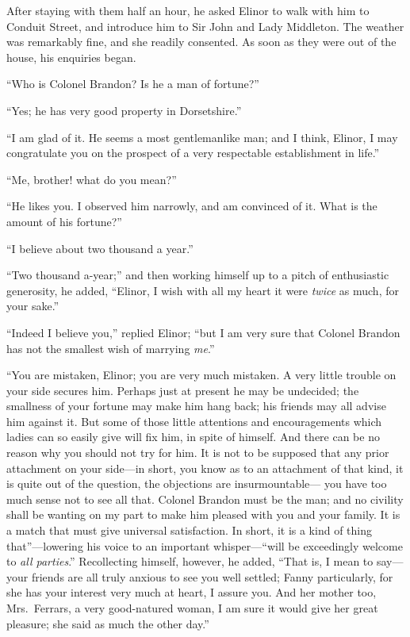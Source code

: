 After staying with them half an hour, he asked
Elinor to walk with him to Conduit Street, and introduce
him to Sir John and Lady Middleton.  The weather was
remarkably fine, and she readily consented.  As soon
as they were out of the house, his enquiries began.

``Who is Colonel Brandon?  Is he a man of fortune?''

``Yes; he has very good property in Dorsetshire.''

``I am glad of it.  He seems a most gentlemanlike man;
and I think, Elinor, I may congratulate you on the prospect
of a very respectable establishment in life.''

``Me, brother! what do you mean?''

``He likes you.  I observed him narrowly, and am
convinced of it.  What is the amount of his fortune?''

``I believe about two thousand a year.''

``Two thousand a-year;'' and then working himself
up to a pitch of enthusiastic generosity, he added,
``Elinor, I wish with all my heart it were \emph{twice} as much,
for your sake.''

``Indeed I believe you,'' replied Elinor; ``but I am
very sure that Colonel Brandon has not the smallest wish
of marrying \emph{me}.''

``You are mistaken, Elinor; you are very much mistaken.
A very little trouble on your side secures him.
Perhaps just at present he may be undecided; the smallness
of your fortune may make him hang back; his friends
may all advise him against it.  But some of those little
attentions and encouragements which ladies can so easily
give will fix him, in spite of himself.  And there can be
no reason why you should not try for him.  It is not to be
supposed that any prior attachment on your side---in short,
you know as to an attachment of that kind, it is quite
out of the question, the objections are insurmountable---%
you have too much sense not to see all that.  Colonel Brandon
must be the man; and no civility shall be wanting on
my part to make him pleased with you and your family.
It is a match that must give universal satisfaction.
In short, it is a kind of thing that''---lowering his voice
to an important whisper---``will be exceedingly welcome
to \emph{all parties}.'' Recollecting himself, however, he added,
``That is, I mean to say---your friends are all truly
anxious to see you well settled; Fanny particularly,
for she has your interest very much at heart, I assure you.
And her mother too, Mrs.\ Ferrars, a very good-natured woman,
I am sure it would give her great pleasure; she said as much
the other day.''

